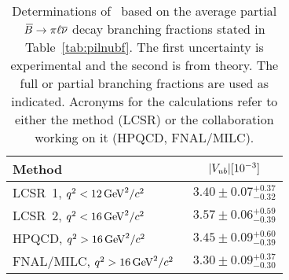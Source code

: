 
\begin{table}[hbtf]
\caption{\label{tab:pilnuvub}
Determinations of \vub\ based on the average partial
$\kern 0.18em\overline{\kern -0.18em B}{}\to\pi\ell\overline{\nu}$ decay branching fractions stated in
Table~\ref{tab:pilnubf}. The first
uncertainty is experimental and the second is from theory.  The
full or partial branching fractions are used as indicated. 
Acronyms for the calculations refer to either the method (LCSR) or
the collaboration working on it (HPQCD, FNAL/MILC).
}
\begin{center}
\begin{tabular}{|lc|}
\hline
Method                                                     & $|V_{ub}| [10^{-3}]$ \\\hline\hline
LCSR~1,    $q^2<12\,\mathrm{Ge\kern -0.1em V}^2/c^2$~\cite{Khodjamirian:2011ub} & $3.40\pm 0.07 {}^{+0.37}_{-0.32}$ \\ \hline
LCSR~2,    $q^2<16\,\mathrm{Ge\kern -0.1em V}^2/c^2$~\cite{Ball:2004ye}         & $3.57\pm 0.06 {}^{+0.59}_{-0.39}$ \\ \hline
HPQCD,     $q^2>16\,\mathrm{Ge\kern -0.1em V}^2/c^2$~\cite{Dalgic:2006dt}       & $3.45\pm 0.09 {}^{+0.60}_{-0.39}$ \\  \hline
FNAL/MILC, $q^2>16\,\mathrm{Ge\kern -0.1em V}^2/c^2$~\cite{Bailey:2008wp}       & $3.30\pm 0.09 {}^{+0.37}_{-0.30}$ \\  \hline
\hline
\end{tabular}
\end{center}
\end{table}
